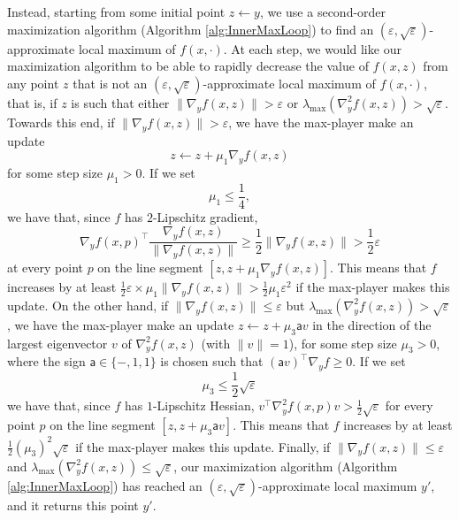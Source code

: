 \documentclass[11pt,letterpaper]{article}
\renewcommand{\epsilon}{\varepsilon}
\begin{document}
 Instead, starting from some initial point $z \leftarrow y$, we use a second-order maximization algorithm (Algorithm \ref{alg:InnerMaxLoop}) to find an $(\epsilon, \sqrt{\epsilon})$-approximate local maximum of $f(x,\cdot)$.
At each step, we would like our maximization algorithm to be able to rapidly decrease the value of $f(x,z)$ from any point $z$ that is not an $(\epsilon, \sqrt{\epsilon})$-approximate local maximum of $f(x,\cdot)$, that is, if $z$ is such that either $\|\nabla_y f(x,z)\| > \epsilon$ or $\lambda_{\mathrm{max}}(\nabla_y^2 f(x,z)) > \sqrt{\epsilon}$.
%
Towards this end, if $\|\nabla_y f(x,z)\| > \epsilon$, we have the max-player make an update $$z \leftarrow z+\mu_1 \nabla_y f(x,z)$$ for some step size $\mu_1>0$. %
  If we set
 \begin{equation}  \label{eq_mu1} 
 \mu_1 \leq \frac{1}{4},
 \end{equation}
  we have that, since $f$ has $2$-Lipschitz gradient, $$\nabla_y f(x,p)^\top \frac{\nabla_y f(x,z)}{\|\nabla_y f(x,z)\|} \geq \frac{1}{2} \|\nabla_y f(x,z)\|  > \frac{1}{2} \epsilon$$ at every point $p$ on the line segment $[z, z+\mu_1 \nabla_y f(x,z)]$.  
  This means that $f$ increases by at least $\frac{1}{2} \epsilon \times \mu_1  \|\nabla_y f(x,z)\|  > \frac{1}{2} \mu_1 \epsilon^2$  if the max-player makes this update.
On the other hand, if $\|\nabla_y f(x,z)\| \leq \epsilon$ but $\lambda_{\mathrm{max}}(\nabla_y^2 f(x,z)) > \sqrt{\epsilon}$, we have the max-player make an update $ z \leftarrow z+ \mu_3 \mathsf{a} v$ in the direction of the largest eigenvector $v$ of $\nabla_y^2 f(x,z)$ (with $\|v\|=1$), for some step size $\mu_3>0$, where the sign $\mathsf{a} \in \{-,1,1\}$ is chosen such that $(\mathsf{a} v)^\top \nabla_y f \geq 0$. %
If we set
%
 \begin{equation}  \label{eq_mu3}  
\mu_3 \leq \frac{1}{2} \sqrt{\epsilon}
 \end{equation}
we have that, since $f$ has $1$-Lipschitz Hessian, $v^\top \nabla_y^2 f(x,p) v > \frac{1}{2} \sqrt{\epsilon}$ for every point $p$ on the line segment $[z, z+ \mu_3 \mathsf{a} v]$.
 This means that $f$ increases by at least $\frac{1}{2} (\mu_3)^2 \sqrt{\epsilon}$ if the max-player makes this update.
Finally, if $\|\nabla_y f(x,z)\| \leq \epsilon$ and $\lambda_{\mathrm{max}}(\nabla_y^2 f(x,z)) \leq \sqrt{\epsilon}$, our maximization algorithm (Algorithm \ref{alg:InnerMaxLoop}) has reached an $(\epsilon, \sqrt{\epsilon})$-approximate local maximum $y'$, and it returns this point $y'$.
\end{document}
